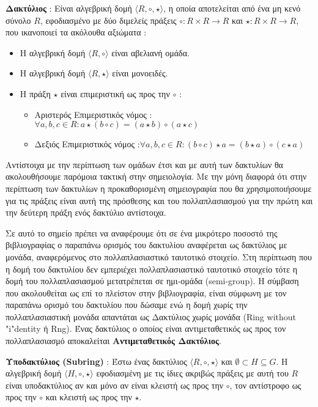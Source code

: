 \begin{definition}
\textbf{Δακτύλιος} : Είναι αλγεβρική δομή $\langle R, \circ, \star \rangle$, η οποία αποτελείται από ένα μη κενό σύνολο $R$, εφοδιασμένο με δύο διμελείς πράξεις $\circ:R \times R \rightarrow R$ και $\star: R \times R \rightarrow R$, που ικανοποιεί τα ακόλουθα αξιώματα :

\begin{itemize}
    \item Η αλγεβρική δομή $\langle R, \circ \rangle$ είναι αβελιανή ομάδα.
    \item Η αλγεβρική δομή $\langle R, \star \rangle$ είναι μονοειδές.
    \item Η πράξη $\star$ είναι επιμεριστική ως προς την $\circ$ :
    \begin{itemize}
        \item Αριστερός Επιμεριστικός νόμος : $\forall a, b, c \in R : a \star (b \circ c) = (a \star b) \circ (a \star c)$
        \item Δεξιός Επιμεριστικός νόμος :$\forall a, b, c \in R : (b \circ c) \star a = (b \star a) \circ (c \star a)$
    \end{itemize}
    \end{itemize}
\end{definition}

Αντίστοιχα με την περίπτωση των ομάδων έτσι και με αυτή των δακτυλίων θα ακολουθήσουμε παρόμοια τακτική στην σημειολογία. Με την μόνη διαφορά ότι στην περίπτωση των δακτυλίων η προκαθορισμένη σημειογραφία που θα χρησιμοποιήσουμε για τις πράξεις είναι αυτή της πρόσθεσης και του πολλαπλασιασμού για την πρώτη και την δεύτερη πράξη ενός δακτύλιο αντίστοιχα.

Σε αυτό το σημείο πρέπει να αναφέρουμε ότι σε ένα μικρότερο ποσοστό της βιβλιογραφίας ο παραπάνω ορισμός του δακτυλίου αναφέρεται ως δακτύλιος με μονάδα, αναφερόμενος στο πολλαπλασιαστικό ταυτοτικό στοιχείο. Στη περίπτωση που η δομή του δακτυλίου δεν εμπεριέχει πολλαπλασιαστικό ταυτοτικό στοιχείο τότε η δομή του πολλαπλασιασμού μετατρέπεται σε ημι-ομάδα (semi-group). Η σύμβαση που ακολουθείται ως επί το πλείστον στην βιβλιογραφία, είναι σύμφωνη με τον παραπάνω ορισμό του δακτυλίου που δώσαμε ενώ η δομή χωρίς την πολλαπλασιαστική μονάδα απαντάται ως Δακτύλιος χωρίς μονάδα (Ring without "i"dentity ή Rng). Ένας δακτύλιος ο οποίος είναι αντιμεταθετικός ως προς τον πολλαπλασιασμό αποκαλείται \textbf{Αντιμεταθετικός Δακτύλιος}. 

\begin{definition}
\textbf{Υποδακτύλιος (Subring)} : Έστω ένας δακτύλιος $\langle R, \circ, \star \rangle$ και $\emptyset \subset Η \subseteq G$. Η αλγεβρική δομή $\langle H, \circ, \star \rangle$ εφοδιασμένη με τις ίδιες ακριβώς πράξεις με αυτή του $R$ είναι υποδακτύλιος αν και μόνο αν είναι κλειστή ως προς την $\circ$, τον αντίστροφο ως προς την $\circ$ και κλειστή ως προς την $\star$.
\end{definition}

